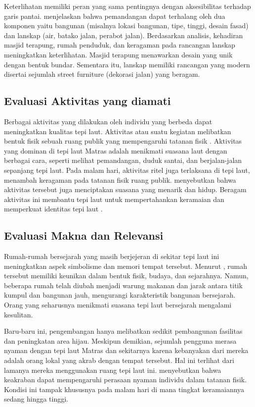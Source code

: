 \documentclass[11pt]{simart} %
\begin{document}
Keterlihatan memiliki peran yang sama pentingnya dengan aksesibilitas terhadap garis pantai. \cite{wanismail2018} menjelaskan bahwa pemandangan dapat terhalang oleh dua komponen yaitu bangunan (misalnya lokasi bangunan, tipe, tinggi, desain fasad) dan lanskap (air, batako jalan, perabot jalan). Berdasarkan analisis, kehadiran masjid terapung, rumah penduduk, dan keragaman pada rancangan lanskap meningkatkan keterlihatan. Masjid terapung menawarkan desain yang unik dengan bentuk bundar. Sementara itu, lanskap memiliki rancangan yang modern disertai sejumlah street furniture (dekorasi jalan) yang beragam.

\subsection{Evaluasi Aktivitas yang diamati}%
\label{sub:Evaluasi Aktivitas yang diamati}

Berbagai aktivitas yang dilakukan oleh individu yang berbeda dapat meningkatkan kualitas tepi laut. Aktivitas atau suatu kegiatan melibatkan bentuk fisik sebuah ruang publik yang mempengaruhi tatanan fisik \citep{wanismail2018}. Aktivitas yang dominan di tepi laut Matras adalah menikmati suasana laut dengan berbagai cara, seperti melihat pemandangan, duduk santai, dan berjalan-jalan sepanjang tepi laut. Pada malam hari, aktivitas ritel juga terlaksana di tepi laut, menambah keragaman pada tatanan fisik ruang publik. \cite{wanismail2018} menyebutkan bahwa aktivitas tersebut juga menciptakan suasana yang menarik dan hidup. Beragam aktivitas ini membantu tepi laut untuk mempertahankan keramaian dan memperkuat identitas tepi laut \citep{iqbal2020}.

\subsection{Evaluasi Makna dan Relevansi}%
\label{sub:Evaluasi Makna dan Relevansi}


Rumah-rumah bersejarah yang masih berjejeran di sekitar tepi laut ini meningkatkan aspek simbolisme dan memori tempat tersebut. Menurut \cite{iqbal2020}, rumah tersebut memiliki keunikan dalam bentuk fisik, budaya, dan sejarahnya. Namun, beberapa rumah telah diubah menjadi warung makanan dan jarak antara titik kumpul dan bangunan jauh, mengurangi karakteristik bangunan bersejarah. Orang yang seharusnya menikmati suasana tepi laut bersejarah mengalami kesulitan.


Baru-baru ini, pengembangan hanya melibatkan sedikit pembangunan fasilitas dan peningkatan area hijau. Meskipun demikian, sejumlah pengguna merasa nyaman dengan tepi laut Matras dan sekitarnya karena kebanyakan dari mereka adalah orang lokal yang akrab dengan tempat tersebut. Hal ini terlihat dari lamanya mereka menggunakan ruang tepi laut ini. \cite{ujang2017} menyebutkan bahwa keakraban dapat mempengaruhi perasaan nyaman individu dalam tatanan fisik. Kondisi ini tampak khususnya pada malam hari di mana tingkat keramaiannya sedang hingga tinggi.
\end{document}
